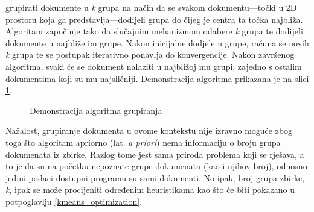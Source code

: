 \documentclass[times, utf8, zavrsni]{fer}
\begin{document}
grupirati dokumente u \textit{k} grupa na način da se svakom dokumentu—točki u 2D prostoru koja ga predstavlja—dodijeli grupa do čijeg je centra ta točka najbliža. Algoritam započinje tako da slučajnim mehanizmom odabere \textit{k} grupa te dodijeli dokumente u najbliže im grupe. Nakon inicijalne dodjele u grupe, računa se novih \textit{k} grupa te se postupak iterativno ponavlja do konvergencije. Nakon završenog algoritma, svaki će se dokument nalaziti u najbližoj mu grupi, zajedno s ostalim dokumentima koji su mu najsličniji. Demonstracija algoritma prikazana je na slici
\ref{img:clustering}.

\begin{figure}
\caption{Demonstracija algoritma grupiranja}
\label{img:clustering}
\end{figure}

Nažalost, grupiranje dokumenta u ovome kontekstu nije izravno moguće zbog toga što algoritam apriorno (lat. \textit{a priori}) nema informaciju o broju grupa dokumenata iz zbirke. Razlog tome jest sama priroda problema koji se rješava, a to je da su na početku nepoznate grupe dokumenata (kao i njihov broj), odnosno jedini podaci dostupni programu su sami dokumenti. No ipak, broj grupa zbirke, \textit{k}, ipak se može procijeniti određenim heuristikama kao što će biti pokazano u potpoglavlju \ref{kmeans_optimization}.
\end{document}
